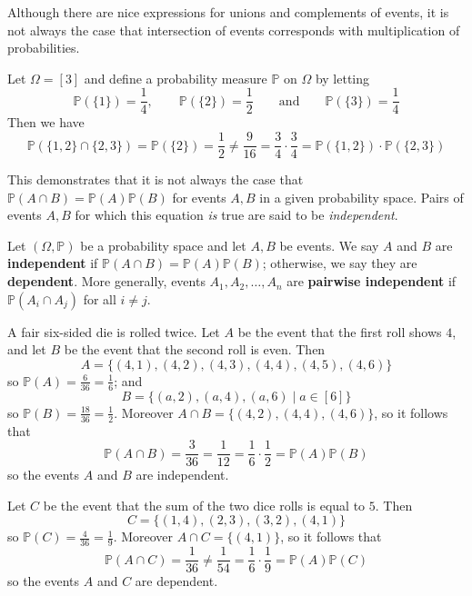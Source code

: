 Although there are nice expressions for unions and complements of events, it is not always the case that intersection of events corresponds with multiplication of probabilities.

\begin{example}
Let $\Omega = [3]$ and define a probability measure $\mathbb{P}$ on $\Omega$ by letting
\[ \mathbb{P}(\{1\}) = \frac{1}{4}, \qquad \mathbb{P}(\{2\}) = \frac{1}{2} \qquad \text{and} \qquad \mathbb{P}(\{3\}) = \frac{1}{4} \]
Then we have
\[ \mathbb{P}(\{1,2\} \cap \{2,3\}) = \mathbb{P}(\{2\}) = \frac{1}{2} \ne \frac{9}{16} = \frac{3}{4} \cdot \frac{3}{4} = \mathbb{P}(\{1,2\}) \cdot \mathbb{P}(\{2,3\}) \]
\end{example}

This demonstrates that it is not always the case that $\mathbb{P}(A \cap B) = \mathbb{P}(A) \mathbb{P}(B)$ for events $A,B$ in a given probability space. Pairs of events $A,B$ for which this equation \textit{is} true are said to be \textit{independent}.

\begin{definition}
\label{defIndependentEvents}
Let $(\Omega,\mathbb{P})$ be a probability space and let $A,B$ be events. We say $A$ and $B$ are \textbf{independent} if $\mathbb{P}(A \cap B) = \mathbb{P}(A)\mathbb{P}(B)$; otherwise, we say they are \textbf{dependent}. More generally, events $A_1,A_2,\dots,A_n$ are \textbf{pairwise independent} if $\mathbb{P}(A_i \cap A_j)$ for all $i \ne j$.
\end{definition}

\begin{example}
A fair six-sided die is rolled twice. Let $A$ be the event that the first roll shows $4$, and let $B$ be the event that the second roll is even. Then
\[ A = \{ (4,1), (4,2), (4,3), (4,4), (4,5), (4,6) \} \]
so $\mathbb{P}(A) = \frac{6}{36} = \frac{1}{6}$; and
\[ B = \{ (a,2), (a,4), (a,6) \mid a \in [6] \} \]
so $\mathbb{P}(B) = \frac{18}{36} = \frac{1}{2}$. Moreover $A \cap B = \{ (4,2), (4,4), (4,6) \}$, so it follows that
\[ \mathbb{P}(A \cap B) = \frac{3}{36} = \frac{1}{12} = \frac{1}{6} \cdot \frac{1}{2} = \mathbb{P}(A)\mathbb{P}(B) \]
so the events $A$ and $B$ are independent.

Let $C$ be the event that the sum of the two dice rolls is equal to $5$. Then
\[ C = \{ (1,4), (2,3), (3,2), (4,1) \} \]
so $\mathbb{P}(C) = \frac{4}{36} = \frac{1}{9}$. Moreover $A \cap C = \{ (4, 1) \}$, so it follows that
\[ \mathbb{P}(A \cap C) = \frac{1}{36} \ne \frac{1}{54} = \frac{1}{6} \cdot \frac{1}{9} = \mathbb{P}(A)\mathbb{P}(C) \]
so the events $A$ and $C$ are dependent.
\end{example}

